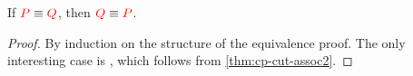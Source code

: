 \begin{theorem}[Symmetry]\label{thm:cp-symmetry}
  If $\textcolor{red}{P} \equiv \textcolor{red}{Q}$, then $\textcolor{red}{Q} \equiv \textcolor{red}{P}$.
\end{theorem}
\begin{proof}
  By induction on the structure of the equivalence proof.
  The only interesting case is , which follows from
  \cref{thm:cp-cut-assoc2}.
\end{proof}
